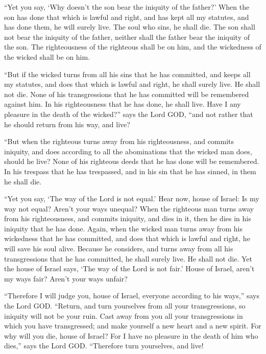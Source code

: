  ``Yet you say, `Why doesn't the son bear the iniquity of
the father?' When the son has done that which is lawful and right, and
has kept all my statutes, and has done them, he will surely live.
 The soul who sins, he shall die. The son shall not bear
the iniquity of the father, neither shall the father bear the iniquity
of the son. The righteousness of the righteous shall be on him, and the
wickedness of the wicked shall be on him.

 ``But if the wicked turns from all his sins that he has
committed, and keeps all my statutes, and does that which is lawful and
right, he shall surely live. He shall not die.  None of
his transgressions that he has committed will be remembered against him.
In his righteousness that he has done, he shall live. 
Have I any pleasure in the death of the wicked?'' says the Lord GOD,
``and not rather that he should return from his way, and live?

 ``But when the righteous turns away from his
righteousness, and commits iniquity, and does according to all the
abominations that the wicked man does, should he live? None of his
righteous deeds that he has done will be remembered. In his trespass
that he has trespassed, and in his sin that he has sinned, in them he
shall die.

 ``Yet you say, `The way of the Lord is not equal.' Hear
now, house of Israel: Is my way not equal? Aren't your ways unequal?
 When the righteous man turns away from his
righteousness, and commits iniquity, and dies in it, then he dies in his
iniquity that he has done.  Again, when the wicked man
turns away from his wickedness that he has committed, and does that
which is lawful and right, he will save his soul alive. 
Because he considers, and turns away from all his transgressions that he
has committed, he shall surely live. He shall not die. 
Yet the house of Israel says, `The way of the Lord is not fair.' House
of Israel, aren't my ways fair? Aren't your ways unfair?

 ``Therefore I will judge you, house of Israel, everyone
according to his ways,'' says the Lord GOD. ``Return, and turn
yourselves from all your transgressions, so iniquity will not be your
ruin.  Cast away from you all your transgressions in
which you have transgressed; and make yourself a new heart and a new
spirit. For why will you die, house of Israel?  For I
have no pleasure in the death of him who dies,'' says the Lord GOD.
``Therefore turn yourselves, and live!

